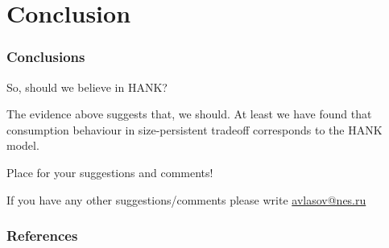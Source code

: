 \documentclass[11pt,pdf,aspectratio=129]{beamer}
\begin{document}
\section{Conclusion}
\begin{frame}\frametitle{Conclusions}
    \begin{block}{So, should we believe in HANK?}

        The evidence above suggests that, we should. 
        At least we have found that consumption behaviour in size-persistent tradeoff corresponds to the HANK model.


    \end{block}
\end{frame}





\begin{frame}

\begin{center}
    \Large Place for your suggestions and comments!
\end{center} 
\begin{center}
    \footnotesize
If you have any other suggestions/comments  please write \href{mailto://avlasov@nes.ru}{avlasov@nes.ru}
\end{center}


\end{frame}



\begin{frame}[t, allowframebreaks]
    \frametitle{References}
   
    
    \end{frame}
\end{document}
